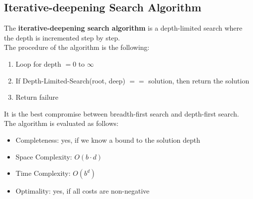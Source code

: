 \documentclass{article}
\begin{document}
\subsection{Iterative-deepening Search Algorithm}
The \textbf{iterative-deepening search algorithm} is a depth-limited search where the depth is incremented step by step. \\
The procedure of the algorithm is the following:
\begin{enumerate}
    \item Loop for depth $= 0$ to $\infty$
    \item If Depth-Limited-Search(root, deep) $==$ solution, then return the solution
    \item Return failure
\end{enumerate}
It is the best compromise between breadth-first search and depth-first search. \\
The algorithm is evaluated as follows:
\begin{itemize}
    \item Completeness: yes, if we know a bound to the solution depth
    \item Space Complexity: $O(b \cdot d)$
    \item Time Complexity: $O(b^d)$
    \item Optimality: yes, if all costs are non-negative
\end{itemize}
\newpage
\end{document}
